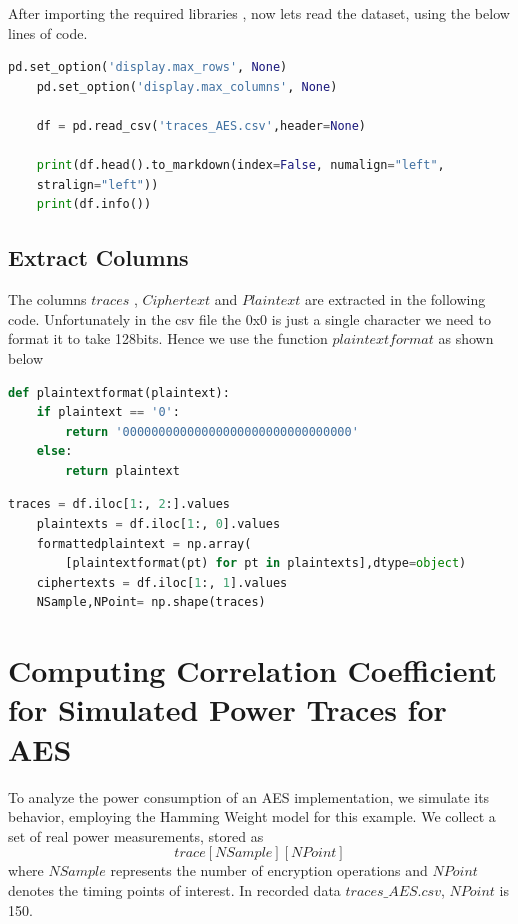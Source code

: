 \documentclass[12pt, letterpaper, oneside]{report}
\begin{document}
After importing the required libraries , now lets read the dataset, using the below lines of code.\\


\begin{lstlisting}[language=Python, caption=Reading the dataset]
    pd.set_option('display.max_rows', None)
    pd.set_option('display.max_columns', None)
    
    df = pd.read_csv('traces_AES.csv',header=None)
    
    print(df.head().to_markdown(index=False, numalign="left",
    stralign="left"))
    print(df.info())
\end{lstlisting}

\section{Extract Columns}

The columns $traces$ , $Ciphertext$ and $Plaintext$ are extracted in the following code. Unfortunately in the csv file the 0x0 is just a single character we need to format it to take 128bits. Hence we use the function $plaintextformat$ as shown below \\


\begin{lstlisting}[language=Python, caption=Normalising the data]
    def plaintextformat(plaintext):
    if plaintext == '0':
        return '00000000000000000000000000000000'
    else:
        return plaintext
\end{lstlisting} 


\begin{lstlisting}[language=Python, caption=Extracting Columns]
    traces = df.iloc[1:, 2:].values
    plaintexts = df.iloc[1:, 0].values
    formattedplaintext = np.array(
        [plaintextformat(pt) for pt in plaintexts],dtype=object)
    ciphertexts = df.iloc[1:, 1].values
    NSample,NPoint= np.shape(traces)
\end{lstlisting} 

\chapter{Computing Correlation Coeﬃcient for Simulated Power Traces for AES}

To analyze the power consumption of an AES implementation, we simulate its behavior, employing the Hamming Weight model for this example. We collect a set of real power measurements, stored as $$trace[NSample][NPoint]$$ where $NSample$ represents the number of encryption operations and $NPoint$ denotes the timing points of interest. In recorded data $traces\_AES.csv$, $NPoint$ is 150.\\
\end{document}
